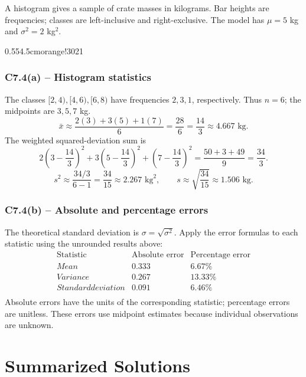 {
A histogram gives a sample of crate masses in kilograms. Bar heights are
frequencies; classes are left-inclusive and right-exclusive. The model
has $\mu=5$ kg and $\sigma^2=2$ kg$^2$.
\begin{center}
{0.55\textwidth}{4.5cm}{orange!30}{2}{1}
\end{center}
\label{sol:c7-4a}
\subsubsection*{C7.4(a) -- Histogram statistics }
The classes $[2,4),[4,6),[6,8)$ have frequencies $2,3,1$, respectively.
Thus $n=6$; the midpoints are $3,5,7$ kg.
\[
\bar{x}\approx\frac{2(3)+3(5)+1(7)}{6}=\frac{28}{6}=\frac{14}{3}
\approx4.667\text{ kg}.
\]
The weighted squared-deviation sum is
\[
2\left(3-\frac{14}{3}\right)^2+
3\left(5-\frac{14}{3}\right)^2+
\left(7-\frac{14}{3}\right)^2
=\frac{50+3+49}{9}=\frac{34}{3}.
\]
\[
s^2\approx\frac{34/3}{6-1}=\frac{34}{15}\approx2.267\text{ kg}^2,
\qquad s\approx\sqrt{\frac{34}{15}}\approx1.506\text{ kg}.
\]
\label{sol:c7-4b}
\subsubsection*{C7.4(b) -- Absolute and percentage errors }
The theoretical standard deviation is $\sigma=\sqrt{\sigma^2}$.
Apply the error formulas to each statistic using the unrounded results above:
\[
\begin{array}{l|rr}
\text{Statistic}&\text{Absolute error}&\text{Percentage error}\\\hline
Mean&0.333&6.67\%\\
Variance&0.267&13.33\%\\
Standard deviation&0.091&6.46\%\\
\end{array}
\]
Absolute errors have the units of the corresponding statistic; percentage errors are unitless.
These errors use midpoint estimates because individual observations are unknown.
\secInicio[sec:c7-4]

\newpage
\section{Summarized Solutions}
}
